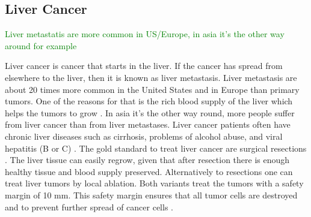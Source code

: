 \subsection{Liver Cancer}
\textcolor{green}{Liver metastatis are more common in US/Europe, in asia it's the other way around for example}

Liver cancer is cancer that starts in the liver. If the cancer has spread from
elsewhere to the liver, then it is known as liver metastasis. Liver metastasis
are about 20 times more common in the United States and in Europe than primary tumors. One of the reasons for that
is the rich blood supply of the liver which helps the tumors to grow
\cite{mcguire2016world}. In asia it's the other way round, more people suffer
from liver cancer than from liver metastases. Liver cancer patients often have chronic liver diseases
such as cirrhosis, problems of alcohol abuse, and viral hepatitis (B or C)
\cite{galun2015hepatocellular}. The gold standard to treat liver cancer are
surgical resections \cite{lencioni2012local}. The liver tissue can easily regrow, given that after resection there is
enough healthy tissue and blood supply preserved. Alternatively to resections
one can treat liver tumors by local ablation. Both variants treat the tumors
with a safety margin of 10 mm. This safety margin ensures that all tumor cells
are destroyed and to prevent further spread of cancer cells \cite{mahnken2009ct}.
